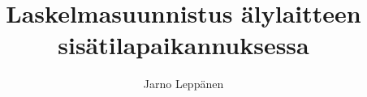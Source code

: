 \documentclass[finnish,11pt]{tktltiki2}
\title{Laskelmasuunnistus älylaitteen sisätilapaikannuksessa}
\author{Jarno Leppänen}
\date{\displaydate{date}}
\theoremstyle{definition}
\theoremstyle{remark}
\begin{document}

\frontmatter      %

\maketitle        %
\makeabstract     %

\tableofcontents  %


\mainmatter       %





%
%
% 
%







%
\end{document}
